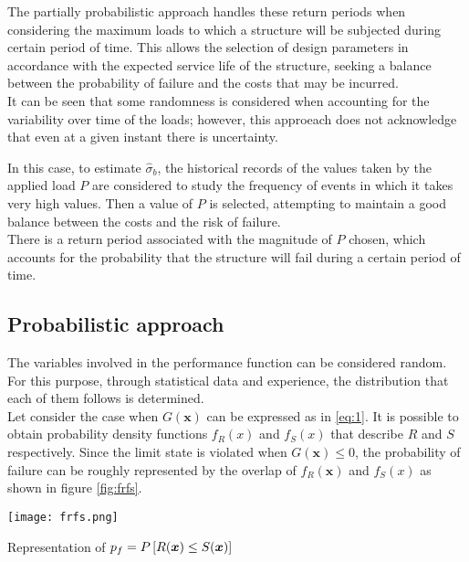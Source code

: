 The partially probabilistic approach handles these return periods when considering
the maximum loads to which a structure will be subjected during certain period of time. This allows the selection of design parameters in accordance with the expected service life of the structure, seeking a balance between the probability of failure and the costs that may be incurred. \\

It can be seen that some randomness is considered when accounting for the variability over time of the loads; however, this approeach does not acknowledge that even at a given instant there is uncertainty.

\begin{testexample}
    In this case, to estimate $\hat{\sigma}_b$, the historical records of the values taken by the applied load $P$ are considered to study the frequency of events in which it takes very high values. Then a value of $P$ is selected, attempting to maintain a good balance between the costs and the risk of failure. \\
    
    There is a return period associated with the magnitude of $P$ chosen, which accounts for the probability that the structure will fail during a certain period of time.
\end{testexample}

\subsection{Probabilistic approach}
The variables involved in the performance function can be considered random. For this purpose, through statistical data and experience, the distribution that each of them follows is determined. \\

Let consider the case when $G(\bm{x})$ can be expressed as in \ref{eq:1}. It is possible to obtain probability density functions $f_R(x)$ and $f_S(x)$ that describe $R$ and $S$ respectively. Since the limit state is violated when $G(\bm{x}) \leq 0$, the probability of failure can be roughly represented by the overlap of $f_R(\bm{x})$ and $f_S(x)$ as shown in figure \ref{fig:frfs}. \\

\begin{marginfigure}[-12\baselineskip]
    \texttt{[image: frfs.png]}
    \caption{Representation of $p_f = P\left[ R(\bm{x}) \leq S(\bm{x}) \right]$}
    \label{fig:frfs}
\end{marginfigure}

